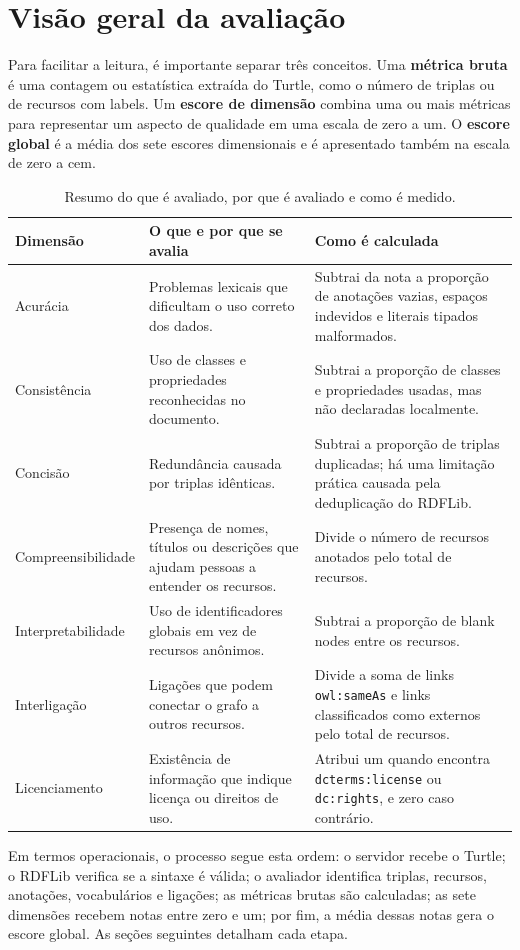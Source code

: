 \documentclass[12pt,a4paper]{article}
\begin{document}
\section{Visão geral da avaliação}
Para facilitar a leitura, é importante separar três conceitos. Uma \textbf{métrica bruta} é uma contagem ou estatística extraída do Turtle, como o número de triplas ou de recursos com labels. Um \textbf{escore de dimensão} combina uma ou mais métricas para representar um aspecto de qualidade em uma escala de zero a um. O \textbf{escore global} é a média dos sete escores dimensionais e é apresentado também na escala de zero a cem.
\begin{table}[htbp]
  \centering
  \caption{Resumo do que é avaliado, por que é avaliado e como é medido.}
  \small
  \begin{tabularx}{\textwidth}{>{\raggedright\arraybackslash}p{2.7cm}X X}
    \toprule
    \textbf{Dimensão} & \textbf{O que e por que se avalia} & \textbf{Como é calculada} \\
    \midrule
    Acurácia & Problemas lexicais que dificultam o uso correto dos dados. & Subtrai da nota a proporção de anotações vazias, espaços indevidos e literais tipados malformados. \\
    Consistência & Uso de classes e propriedades reconhecidas no documento. & Subtrai a proporção de classes e propriedades usadas, mas não declaradas localmente. \\
    Concisão & Redundância causada por triplas idênticas. & Subtrai a proporção de triplas duplicadas; há uma limitação prática causada pela deduplicação do RDFLib. \\
    Compreensibilidade & Presença de nomes, títulos ou descrições que ajudam pessoas a entender os recursos. & Divide o número de recursos anotados pelo total de recursos. \\
    Interpretabilidade & Uso de identificadores globais em vez de recursos anônimos. & Subtrai a proporção de blank nodes entre os recursos. \\
    Interligação & Ligações que podem conectar o grafo a outros recursos. & Divide a soma de links \texttt{owl:sameAs} e links classificados como externos pelo total de recursos. \\
    Licenciamento & Existência de informação que indique licença ou direitos de uso. & Atribui um quando encontra \texttt{dcterms:license} ou \texttt{dc:rights}, e zero caso contrário. \\
    \bottomrule
  \end{tabularx}
\end{table}
Em termos operacionais, o processo segue esta ordem: o servidor recebe o Turtle; o RDFLib verifica se a sintaxe é válida; o avaliador identifica triplas, recursos, anotações, vocabulários e ligações; as métricas brutas são calculadas; as sete dimensões recebem notas entre zero e um; por fim, a média dessas notas gera o escore global. As seções seguintes detalham cada etapa.
\end{document}
